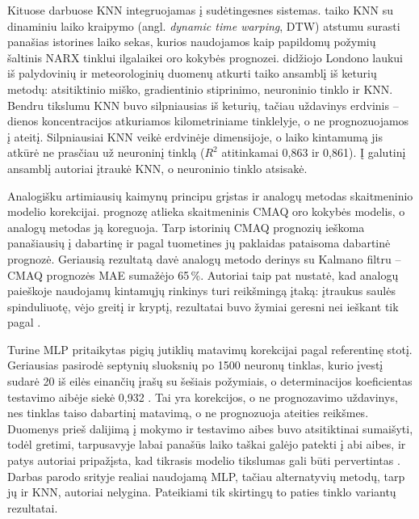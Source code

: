 \documentclass[]{VUMIFTemplateClass}
\begin{document}
    Kituose darbuose KNN integruojamas į sudėtingesnes sistemas.
    \cite{lin2017} taiko KNN su dinaminiu laiko kraipymo (angl. \emph{dynamic time warping}, DTW) atstumu surasti panašias istorines laiko sekas, kurios naudojamos kaip papildomų požymių šaltinis NARX tinklui ilgalaikei oro kokybės prognozei.
    \cite{daneshyazdi2020} didžiojo Londono  laukui iš palydovinių ir meteorologinių duomenų atkurti taiko ansamblį iš keturių metodų: atsitiktinio miško, gradientinio stiprinimo, neuroninio tinklo ir KNN.
    Bendru tikslumu KNN buvo silpniausias iš keturių, tačiau uždavinys erdvinis -- dienos koncentracijos atkuriamos kilometriniame tinklelyje, o ne prognozuojamos į ateitį.
    Silpniausiai KNN veikė erdvinėje dimensijoje, o laiko kintamumą jis atkūrė ne prasčiau už neuroninį tinklą ($R^2$ atitinkamai 0,863 ir 0,861).
    Į galutinį ansamblį autoriai įtraukė KNN, o neuroninio tinklo atsisakė.

    Analogišku artimiausių kaimynų principu grįstas ir analogų metodas skaitmeninio modelio korekcijai.
    \cite{djalova2015}  prognozę atlieka skaitmeninis CMAQ oro kokybės modelis, o analogų metodas ją koreguoja.
    Tarp istorinių CMAQ prognozių ieškoma panašiausių į dabartinę ir pagal tuometines jų paklaidas pataisoma dabartinė prognozė.
    Geriausią rezultatą davė analogų metodo derinys su Kalmano filtru -- CMAQ prognozės MAE sumažėjo 65\,\%.
    Autoriai taip pat nustatė, kad analogų paieškoje naudojamų kintamųjų rinkinys turi reikšmingą įtaką: įtraukus saulės spinduliuotę, vėjo greitį ir kryptį, rezultatai buvo žymiai geresni nei ieškant tik pagal .

    Turine MLP pritaikytas pigių jutiklių  matavimų korekcijai pagal referentinę stotį.
    Geriausias pasirodė septynių sluoksnių po 1500 neuronų tinklas, kurio įvestį sudarė 20 iš eilės einančių įrašų su šešiais požymiais, o determinacijos koeficientas testavimo aibėje siekė 0,932 \cite{casari2023}.
    Tai yra korekcijos, o ne prognozavimo uždavinys, nes tinklas taiso dabartinį matavimą, o ne prognozuoja ateities reikšmes.
    Duomenys prieš dalijimą į mokymo ir testavimo aibes buvo atsitiktinai sumaišyti, todėl gretimi, tarpusavyje labai panašūs laiko taškai galėjo patekti į abi aibes, ir patys autoriai pripažįsta, kad tikrasis modelio tikslumas gali būti pervertintas \cite{casari2023}.
    Darbas parodo srityje realiai naudojamą MLP, tačiau alternatyvių metodų, tarp jų ir KNN, autoriai nelygina.
    Pateikiami tik skirtingų to paties tinklo variantų rezultatai.
\end{document}
